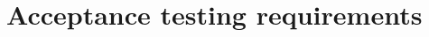 \documentclass{article}
\begin{document}
\section{Acceptance testing requirements}


\end{document}
